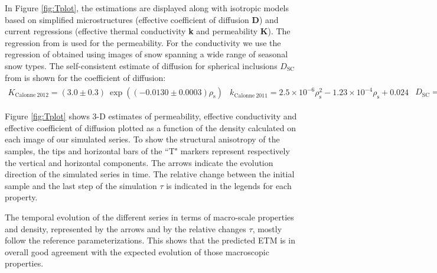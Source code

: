 \documentclass[draft,ms]{agujournal2019}
\begin{document}
In Figure \ref{fig:Tplot}, the estimations are displayed along with isotropic models based on simplified microstructures (effective coefficient of diffusion \textbf{D}) and current regressions (effective thermal conductivity \textbf{k} and permeability \textbf{K}). The regression from  is used for the permeability. For the conductivity we use the regression of  obtained using images of snow spanning a wide range of seasonal snow types. The self-consistent estimate of diffusion for spherical inclusions $D_{\mathrm{SC}}$ from  is shown for the coefficient of diffusion: \\
\begin{subequations}
\begin{align}
K_{\mathrm{Calonne\ 2012}}=(3.0 \pm 0.3)\ \exp \left(\left(-0.0130 \pm 0.0003\right) \rho_{\mathrm{s}}\right)
\end{align}
\begin{align}
k_{\mathrm{Calonne\ 2011}}=2.5 \times 10^{-6} \rho_{\mathrm{s}}^{2}-1.23 \times 10^{-4} \rho_{\mathrm{s}}+0.024\end{align}
\begin{align}
D_{\mathrm{SC}} = 1 - \frac{3\rho_s}{2\rho_i}
\end{align}
\end{subequations}

Figure \ref{fig:Tplot} shows 3-D estimates of permeability, effective conductivity and effective coefficient of diffusion plotted as a function of the density calculated on each image of our simulated series. To show the structural anisotropy of the samples, the tips and horizontal bars of the ``T" markers represent respectively the vertical and horizontal components. The arrows indicate the evolution direction of the simulated series in time. The relative change between the initial sample and the last step of the simulation $\tau$ is indicated in the legends for each property.

The temporal evolution of the different series in terms of macro-scale properties and density, represented by the arrows and by the relative changes $\tau$, mostly follow the reference parameterizations. This shows that the predicted ETM is in overall good agreement with the expected evolution of those macroscopic properties. 
\end{document}
